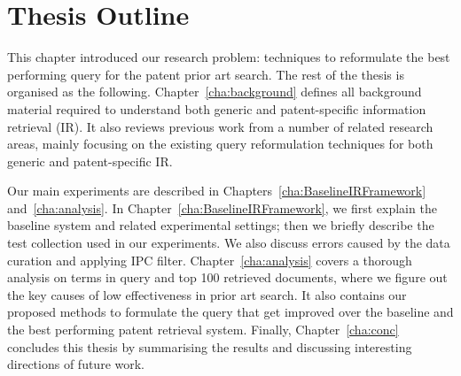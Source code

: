 \section{Thesis Outline}
\label{sec:outline}
This chapter introduced our research problem: techniques to reformulate the best performing 
query for the patent prior art search. The rest of the thesis is organised as the following. 
Chapter~\ref{cha:background} defines all background material required to understand both 
generic and patent-specific information retrieval (IR). It also reviews previous work from a number
of related research areas, mainly focusing on the existing query reformulation techniques for both 
generic and patent-specific IR. 

Our main experiments are described in Chapters~\ref{cha:BaselineIRFramework} and~\ref{cha:analysis}. 
In Chapter~\ref{cha:BaselineIRFramework}, we first explain the baseline system and related experimental settings; 
then we briefly describe the test collection used in our experiments. We also discuss errors caused by the data curation and applying IPC filter.
Chapter~\ref{cha:analysis} covers a thorough analysis on terms in query and top 100 retrieved documents, where we figure out 
the key causes of low effectiveness in prior art search. It also contains our proposed methods to formulate the query that get improved over the baseline and the best performing patent retrieval system. 
Finally, Chapter~\ref{cha:conc} concludes this thesis by 
summarising the results and discussing interesting directions of future work.


